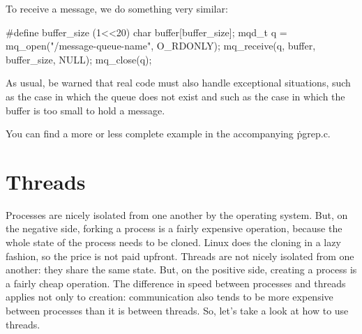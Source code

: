 To receive a message, we do something very similar:
\begin{ccode}
#define buffer_size (1<<20)
char buffer[buffer_size];
mqd_t q = mq_open("/message-queue-name", O_RDONLY);
mq_receive(q, buffer, buffer_size, NULL);
mq_close(q);
\end{ccode}
As usual, be warned that real code must also handle exceptional situations,
  such as the case in which the queue does not exist
  and such as the case in which the buffer is too small to hold a message.

\medskip

You can find a more or less complete example in the accompanying \.{pgrep.c}.


\section{Threads}

Processes are nicely isolated from one another by the operating system.
But, on the negative side, forking a process is a fairly expensive operation,
  because the whole state of the process needs to be cloned.
Linux does the cloning in a lazy fashion, so the price is not paid upfront.
Threads are not nicely isolated from one another: they share the same state.
But, on the positive side, creating a process is a fairly cheap operation.
The difference in speed between processes and threads applies not only to creation:
  communication also tends to be more expensive between processes
  than it is between threads.
So, let's take a look at how to use threads.

